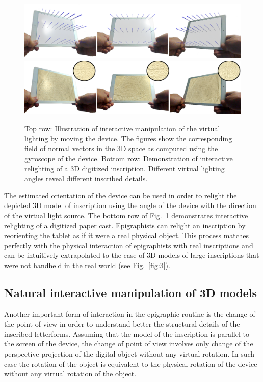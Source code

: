 \documentclass[amsthm,ebook]{saparticle}
\begin{document}
\begin{figure}[!bp]
\centering
 \includegraphics[width=\columnwidth]{EAGLE2016cameraready-img001.png}
 \includegraphics[width=\columnwidth]{EAGLE2016cameraready-img002.png}
\caption{ Top row: Illustration of interactive manipulation of the virtual lighting by moving the device. The figures
show the corresponding field of normal vectors in the 3D space as computed using the gyroscope of the device. Bottom
row: Demonstration of interactive relighting of a 3D digitized inscription. Different virtual lighting angles reveal
different inscribed details. }
\label{fig:1}
\end{figure}

 

The estimated orientation of the device can be used in order to relight the depicted 3D model of inscription using the
angle of the device with the direction of the virtual light source. The bottom row of Fig.~\ref{fig:1} demonstrates interactive
relighting of a digitized paper cast. Epigraphists can relight an inscription by reorienting the tablet as if it were a
real physical object. This process matches perfectly with the physical interaction of epigraphists with real
inscriptions and can be intuitively extrapolated to the case of 3D models of large inscriptions that were not handheld
in the real world (see Fig.~\ref{fig:3}).




\subsection{Natural interactive manipulation of 3D models }


\noindent Another important form of interaction in the epigraphic routine is the change of the point of view in order to
understand better the structural details of the inscribed letterforms. Assuming that the model of the inscription is
parallel to the screen of the device, the change of point of view involves only change of the perspective projection of
the digital object without any virtual rotation. In such case the rotation of the object is equivalent to the physical
rotation of the device without any virtual rotation of the object.
\end{document}
